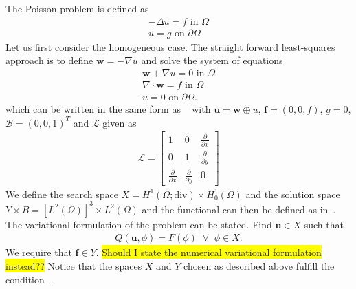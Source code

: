 The Poisson problem is defined as 
\begin{align}
	-\Delta u = f \text{ in } \Omega \\
	u = g \text{ on } \partial \Omega
	\label{eq:Poisson}
\end{align}
Let us first consider the homogeneous case. The straight forward least-squares approach is to define $\mathbf{w} = -\nabla u$ and solve the system of equations 
\begin{align}
	\mathbf{w} + \nabla u = 0 \text{ in } \Omega \\
	\nabla \cdot \mathbf{w} = f \text{ in } \Omega \\
	u = 0 \text{ on } \partial \Omega.
	\label{eq:PoissonSystem}
\end{align}
which can be written in the same form as ~ with $ \mathbf{u} = \mathbf{w} \oplus u $, $\mathbf{f} = (0,0,f)$, $g=0$, $\mathcal{B} = (0,0,1)^T $ and $\mathcal{L}$ given as 
\begin{align}
	\mathcal{L} =
	\begin{bmatrix}
		1 & 0 & \frac{\partial} {\partial x}  \\
		0 & 1 & \frac{\partial} {\partial y}  \\
    \frac{\partial} {\partial x} & \frac{\partial} {\partial y} & 0 
	\end{bmatrix}
	\label{eq:Amatrix}
\end{align}
We define the search space $X =  H^1(\Omega;\text{div}) \times H_0^1(\Omega)$ and the solution space $Y \times B  = [L^2(\Omega)]^3\times L^2(\Omega) $ and the functional can then be defined as in~. The variational formulation of the problem can be stated. Find $ \mathbf{u} \in X $ such that
\begin{align}
	Q(\mathbf{u},\phi) = F(\phi) \;\; \forall \;\; \phi \in X.
	\label{eq:VariationalFormulationPoisson}
\end{align}
We require that $\mathbf{f} \in Y$.
\colorbox{yellow}{Should I state the numerical variational formulation instead??}
Notice that the spaces $X$ and $Y$ chosen as described above fulfill the condition ~. 
%
